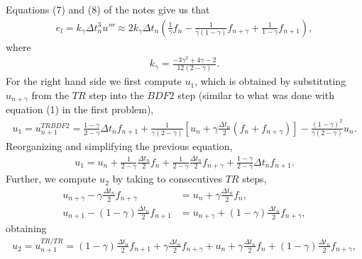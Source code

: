 \begin{questions}

\begin{solution}
Equations (7) and (8) of the notes give us that
\begin{align*}
e_l=k_{\gamma}\Delta t_n^3u'''\approx 2k_{\gamma}\Delta t_n\left(\frac{1}{\gamma}f_n-\frac{1}{\gamma(1-\gamma)}f_{n+\gamma}+\frac{1}{1-\gamma}f_{n+1}\right),
\end{align*}
where
\begin{align*}
k_{\gamma}=\frac{-3\gamma^2+4\gamma-2}{12(2-\gamma)}.
\end{align*}
For the right hand side we first compute $u_1$, which is obtained by substituting $u_{n+\gamma}$ from the $TR$ step into the $BDF2$ step (similar to what was done with equation (1) in the first problem),
\begin{align*}
u_1=u_{n+1}^{TRBDF2}=\frac{1-\gamma}{2-\gamma}\Delta t_nf_{n+1}+\frac{1}{\gamma(2-\gamma)}\left[u_n+\gamma\frac{\Delta t_n}{2}\left(f_n+f_{n+\gamma}\right)\right]-\frac{(1-\gamma)^2}{\gamma(2-\gamma)}u_n.
\end{align*}
Reorganizing and simplifying the previous equation,
\begin{align*}
u_1=u_n+\frac{1}{2-\gamma}\frac{\Delta t_n}{2}f_n+\frac{1}{2-\gamma}\frac{\Delta t_n}{2}f_{n+\gamma}+\frac{1-\gamma}{2-\gamma}\Delta t_nf_{n+1}.
\end{align*}
Further, we compute $u_2$ by taking to consecutives $TR$ steps,
\begin{align*}
u_{n+\gamma}-\gamma\frac{\Delta t_n}{2}f_{n+\gamma}&=u_n+\gamma
\frac{\Delta t_n}{2}f_n,\\
u_{n+1}-(1-\gamma)\frac{\Delta t_n}{2}f_{n+1}&=u_{n+\gamma}+(1-\gamma)\frac{\Delta t_n}{2}f_{n+\gamma},
\end{align*}
obtaining
\begin{align*}
u_2=u_{n+1}^{TR/TR}=(1-\gamma)\frac{\Delta t_n}{2}f_{n+1}+\gamma\frac{\Delta t_n}{2}f_{n+\gamma}+u_n+\gamma
\frac{\Delta t_n}{2}f_n+(1-\gamma)\frac{\Delta t_n}{2}f_{n+\gamma},
\end{align*}
\begin{align*}

\end{align*}
\end{solution}
\end{questions}
